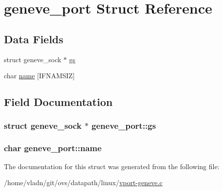 \hypertarget{structgeneve__port}{}\section{geneve\+\_\+port Struct Reference}
\label{structgeneve__port}
\subsection*{Data Fields}
\begin{DoxyCompactItemize}
\item 
struct geneve\+\_\+sock $\ast$ \hyperlink{structgeneve__port_a4748918f17f05d385384df054553a612}{gs}
\item 
char \hyperlink{structgeneve__port_aab8c32b9d0a9be9e27711cd5a7f41226}{name} \mbox{[}I\+F\+N\+A\+M\+S\+I\+Z\mbox{]}
\end{DoxyCompactItemize}


\subsection{Field Documentation}
\hypertarget{structgeneve__port_a4748918f17f05d385384df054553a612}{}
\subsubsection[{gs}]{\setlength{\rightskip}{0pt plus 5cm}struct geneve\+\_\+sock $\ast$ geneve\+\_\+port\+::gs}\label{structgeneve__port_a4748918f17f05d385384df054553a612}
\hypertarget{structgeneve__port_aab8c32b9d0a9be9e27711cd5a7f41226}{}
\subsubsection[{name}]{\setlength{\rightskip}{0pt plus 5cm}char geneve\+\_\+port\+::name}\label{structgeneve__port_aab8c32b9d0a9be9e27711cd5a7f41226}


The documentation for this struct was generated from the following file\+:\begin{DoxyCompactItemize}
\item 
/home/vladn/git/ovs/datapath/linux/\hyperlink{linux_2vport-geneve_8c}{vport-\/geneve.\+c}\end{DoxyCompactItemize}
